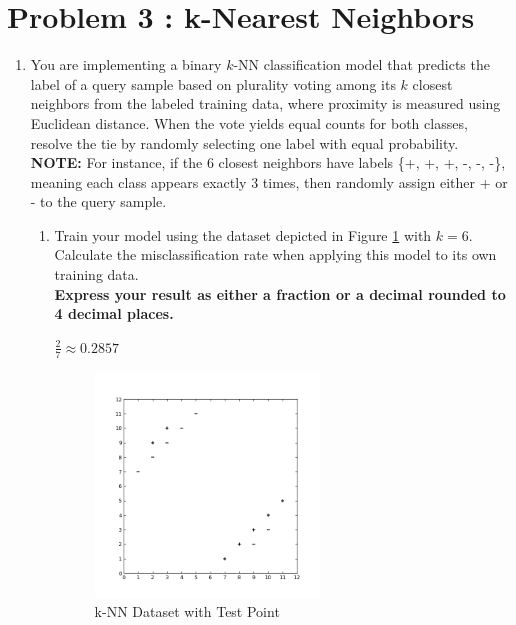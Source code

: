 \documentclass[11pt,addpoints,answers]{exam}
\newcounter{subq}        %
\renewcommand{\thesubq}{(\alph{subq})}  %
\newenvironment{subquestions}{
	\setcounter{subq}{0}%
	\begin{enumerate}[
		label=\thesubq,
		leftmargin=*,
		align=left,
		itemsep=6pt
		]
	}{
	\end{enumerate}
}
\newcommand{\subquestion}{\refstepcounter{subq}\item}  %
\begin{document}
	\section*{Problem 3 : k-Nearest Neighbors}
	\begin{enumerate}[label=\alph*), itemsep=10pt]
		\item[(1)] You are implementing a binary $k$-NN classification model that predicts the label of a query sample based on plurality voting among its $k$ closest neighbors from the labeled training data, where proximity is measured using Euclidean distance. When the vote yields equal counts for both classes, resolve the tie by randomly selecting one label with equal probability.\\
		\textbf{NOTE:} For instance, if the 6 closest neighbors have labels \{+, +, +, -, -, -\}, meaning each class appears exactly 3 times, then randomly assign either + or - to the query sample. 
		
		
		\begin{subquestions}
			\subquestion Train your model using the dataset depicted in Figure \ref{fig:knn6_train} with $k=6$. Calculate the misclassification rate when applying this model to its own training data.\\ \textbf{Express your result as either a fraction or a decimal rounded to 4 decimal places.}
			
			\begin{answer_box}[title=Your answer:,height=2cm,width=5cm]
				$\frac27 \approx 0.2857$
			\end{answer_box}
			
			\begin{figure}[H]
				\centering
				\includegraphics[width=0.6\textwidth]{images/Q2_knn.png}
				\caption{k-NN Dataset with Test Point} \label{fig:knn6_train}  %
			\end{figure}
			

\end{subquestions}
\end{enumerate}
\end{document}
